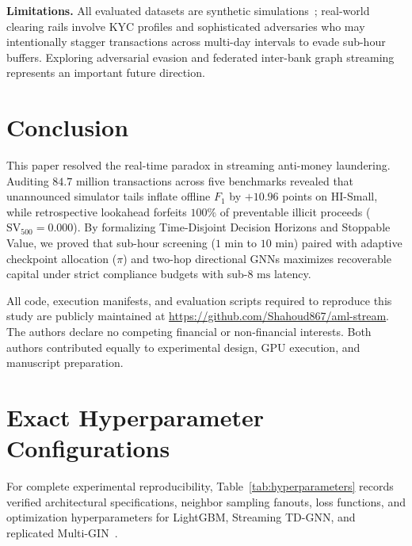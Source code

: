 \documentclass[sigconf,nonacm]{acmart}
\begin{document}
\textbf{Limitations.} All evaluated datasets are synthetic simulations~\cite{altman2023ibmaml,oztas2023samld}; real-world clearing rails involve KYC profiles and sophisticated adversaries who may intentionally stagger transactions across multi-day intervals to evade sub-hour buffers. Exploring adversarial evasion and federated inter-bank graph streaming~\cite{han2026fgegcn} represents an important future direction.

\section{Conclusion}
\label{sec:conclusion}

This paper resolved the real-time paradox in streaming anti-money laundering. Auditing $84.7\text{ million}$ transactions across five benchmarks revealed that unannounced simulator tails inflate offline $F_1$ by $+10.96$ points on HI-Small, while retrospective lookahead forfeits $100\%$ of preventable illicit proceeds ($\text{SV}_{500} = 0.000$). By formalizing Time-Disjoint Decision Horizons and Stoppable Value, we proved that sub-hour screening ($1\text{ min}$ to $10\text{ min}$) paired with adaptive checkpoint allocation ($\pi$) and two-hop directional GNNs maximizes recoverable capital under strict compliance budgets with sub-$8\text{ ms}$ latency.

\begin{acks}
All code, execution manifests, and evaluation scripts required to reproduce this study are publicly maintained at \url{https://github.com/Shahoud867/aml-stream}. The authors declare no competing financial or non-financial interests. Both authors contributed equally to experimental design, GPU execution, and manuscript preparation.
\end{acks}




\appendix

\section{Exact Hyperparameter Configurations}
\label{sec:appendix_hyperparameters}

For complete experimental reproducibility, Table~\ref{tab:hyperparameters} records verified architectural specifications, neighbor sampling fanouts, loss functions, and optimization hyperparameters for LightGBM, Streaming TD-GNN, and replicated Multi-GIN~\cite{egressy2024multigraph}.
\end{document}
